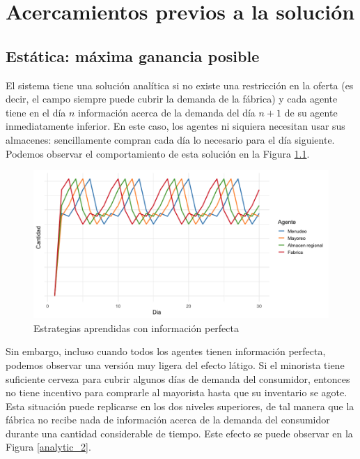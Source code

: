\chapter{Acercamientos previos a la soluci\'on}

\section{Est\'atica: m\'axima ganancia posible}

El sistema tiene una soluci\'on anal\'itica si no existe una restricci\'on en la oferta (es decir, el campo siempre puede cubrir la demanda de la f\'abrica) y cada agente tiene en el d\'ia $n$ informaci\'on acerca de la demanda del d\'ia $n+1$ de su agente inmediatamente inferior. En este caso, los agentes ni siquiera necesitan usar sus almacenes: sencillamente compran cada d\'ia lo necesario para el d\'ia siguiente. Podemos observar el comportamiento de esta soluci\'on en la Figura \ref{analytic_1}.

\begin{figure}[ht!]
\caption{Estrategias aprendidas con informaci\'on perfecta}
\label{analytic_1}
\includegraphics[width=12cm]{tesis_tex/figs/analytic_solution_0_all_0_inv.png}
\centering
\end{figure}

Sin embargo, incluso cuando todos los agentes tienen informaci\'on perfecta, podemos observar una versi\'on muy ligera del efecto l\'atigo. Si el minorista tiene suficiente cerveza para cubrir algunos d\'ias de demanda del consumidor, entonces no tiene incentivo para comprarle al mayorista hasta que su inventario se agote. Esta situaci\'on puede replicarse en los dos niveles superiores, de tal manera que la f\'abrica no recibe nada de informaci\'on acerca de la demanda del consumidor durante una cantidad considerable de tiempo. Este efecto se puede observar en la Figura \ref{analytic_2}.

